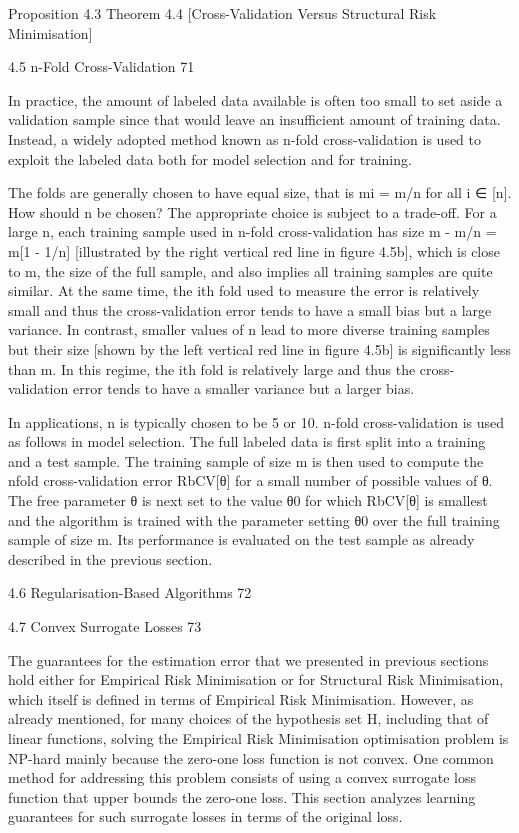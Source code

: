 Proposition 4.3
Theorem 4.4 [Cross-Validation Versus Structural Risk Minimisation]

4.5 n-Fold Cross-Validation 71

In practice, the amount of labeled data available is often too small to set aside a validation sample since that would leave an insufficient amount of training data. Instead, a widely adopted method known as n-fold cross-validation is used to exploit the labeled data both for model selection and for training.

The folds are generally chosen to have equal size, that is mi = m/n for all i ∈ [n]. How should n be chosen? The appropriate choice is subject to a trade-off. For a large n, each training sample used in n-fold cross-validation has size m - m/n = m[1 - 1/n] [illustrated by the right vertical red line in figure 4.5b], which is close to m, the size of the full sample, and also implies all training samples are quite similar. At the same time, the ith fold used to measure the error is relatively small and thus the cross-validation error tends to have a small bias but a large variance. In contrast, smaller values of n lead to more diverse training samples but their size [shown by the left vertical red line in figure 4.5b] is significantly less than m. In this regime, the ith fold is relatively large and thus the cross-validation error tends to have a smaller variance but a larger bias.

In applications, n is typically chosen to be 5 or 10. n-fold cross-validation is used as follows in model selection. The full labeled data is first split into a training and a test sample. The training sample of size m is then used to compute the nfold cross-validation error RbCV[θ] for a small number of possible values of θ. The free parameter θ is next set to the value θ0 for which RbCV[θ] is smallest and the algorithm is trained with the parameter setting θ0 over the full training sample of size m. Its performance is evaluated on the test sample as already described in the previous section.

4.6 Regularisation-Based Algorithms 72



4.7 Convex Surrogate Losses 73

The guarantees for the estimation error that we presented in previous sections hold either for Empirical Risk Minimisation or for Structural Risk Minimisation, which itself is defined in terms of Empirical Risk Minimisation. However, as already mentioned, for many choices of the hypothesis set H, including that of linear functions, solving the Empirical Risk Minimisation optimisation problem is NP-hard mainly because the zero-one loss function is not convex. One common method for addressing this problem consists of using a convex surrogate loss function that upper bounds the zero-one loss. This section analyzes learning guarantees for such surrogate losses in terms of the original loss.

